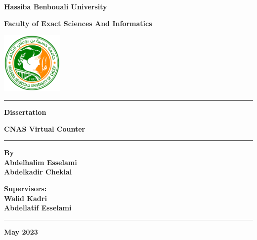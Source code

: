 \documentclass[12pt]{report}
\begin{document}
\begin{titlepage}
    \centering
    
    \textbf{\Huge Hassiba Benbouali University}
    
    \vspace{0.5cm}
    
    \textbf{\LARGE Faculty of Exact Sciences And Informatics}
    
    \vspace{1cm}
    
    \includegraphics[width=3cm]{university-logo.png}
    
    \vspace{2cm}
    
    \rule{\linewidth}{1pt} %
    
    \vspace{0.5cm}
    
    \textbf{\LARGE Dissertation}
    
    \vspace{0.5cm}
    
    \textbf{\huge CNAS Virtual Counter}
    
    \vspace{0.5cm}
    
    \rule{\linewidth}{1pt} %
    
    \begin{minipage}{0.5\textwidth}
        \vspace{8cm}
        \begin{flushleft}
        \textbf{\Large By}\\
        \textbf{\Large Abdelhalim Esselami}\\
        \textbf{\Large Abdelkadir Cheklal}
        \end{flushleft}
        \end{minipage}%
        \begin{minipage}{0.5\textwidth}
        \vspace{8cm}
        \begin{flushright}
        \textbf{\Large Supervisors:}\\
        \textbf{\Large Walid Kadri}\\
        \textbf{\Large Abdellatif Esselami}
        \end{flushright}
        \end{minipage}
    
    \vspace{1cm}
    
    \rule{\linewidth}{1pt} %
    
    \vfill
    
    \textbf{\Large May 2023}
    
    \end{titlepage}
\end{document}
